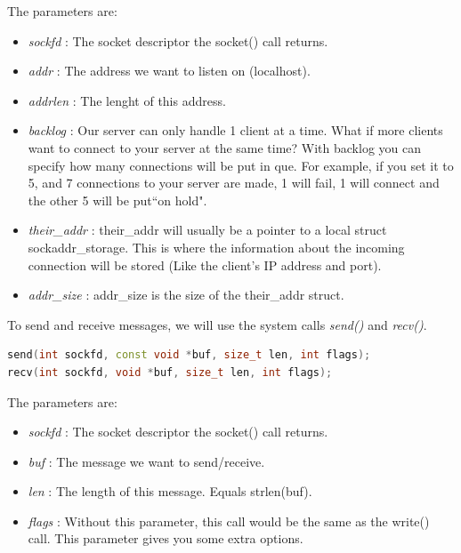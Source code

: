 \documentclass{article}
\begin{document}
				The parameters are:

				\begin{itemize}
				\item \textit{sockfd} : The socket descriptor the socket() call returns. 
				\item \textit{addr} : The address we want to listen on (localhost). 
				\item \textit{addrlen} : The lenght of this address.
				\item \textit{backlog} : Our server can only handle 1 client at a time. What if more clients want to connect to your server at the same time? With backlog you can specify how many connections will be put in que. For example, if you set it to 5, and 7 connections to your server are made, 1 will fail, 1 will connect and the other 5 will be put``on hold".  
				\item \textit{their\_addr} : their\_addr will usually be a pointer to a local struct sockaddr\_storage. This is where the information about the incoming connection will be stored (Like the client's IP address and port). 
				\item \textit{addr\_size} : addr\_size is the size of the their\_addr struct. 
				\end{itemize}

				To send and receive messages, we will use the system calls \textit{send()} and \textit{recv()}.

				\begin{lstlisting}[language=C++, caption={send() and recv() function}]
send(int sockfd, const void *buf, size_t len, int flags); 
recv(int sockfd, void *buf, size_t len, int flags); 
				\end{lstlisting}

				The parameters are:

				\begin{itemize}
				\item \textit{sockfd} : The socket descriptor the socket() call returns. 
				\item \textit{buf} : The message we want to send/receive. 
				\item \textit{len} : The length of this message. Equals strlen(buf). 
				\item \textit{flags} : Without this parameter, this call would be the same as the write() call. This parameter gives you some extra options. 
				\end{itemize}
\end{document}
